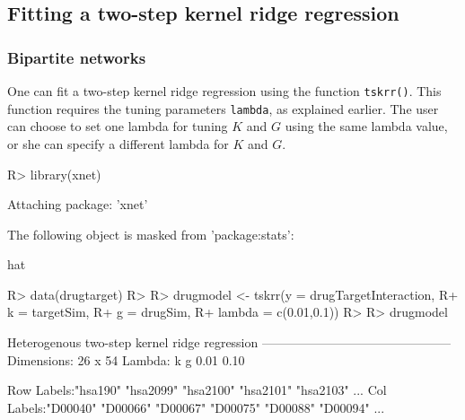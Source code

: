 \documentclass[
]{article}
\begin{document}
\hypertarget{fitting-a-two-step-kernel-ridge-regression}{%
\subsection{Fitting a two-step kernel ridge
regression}\label{fitting-a-two-step-kernel-ridge-regression}}

\hypertarget{bipartite-networks}{%
\subsubsection{Bipartite networks}\label{bipartite-networks}}

One can fit a two-step kernel ridge regression using the function
\texttt{tskrr()}. This function requires the tuning parameters
\texttt{lambda}, as explained earlier. The user can choose to set one
lambda for tuning \(K\) and \(G\) using the same lambda value, or she
can specify a different lambda for \(K\) and \(G\).

\begin{CodeChunk}

\begin{CodeInput}
R> library(xnet)
\end{CodeInput}

\begin{CodeOutput}

Attaching package: 'xnet'
\end{CodeOutput}

\begin{CodeOutput}
The following object is masked from 'package:stats':

    hat
\end{CodeOutput}
\end{CodeChunk}

\begin{CodeChunk}

\begin{CodeInput}
R> data(drugtarget)
R> 
R> drugmodel <- tskrr(y = drugTargetInteraction,
R+                    k = targetSim,
R+                    g = drugSim,
R+                    lambda = c(0.01,0.1))
R> 
R> drugmodel
\end{CodeInput}

\begin{CodeOutput}
Heterogenous two-step kernel ridge regression
---------------------------------------------
Dimensions: 26 x 54 
Lambda:
   k    g 
0.01 0.10 

Row Labels:"hsa190" "hsa2099" "hsa2100" "hsa2101" "hsa2103" ...
Col Labels:"D00040" "D00066" "D00067" "D00075" "D00088" "D00094" ...
\end{CodeOutput}
\end{CodeChunk}
\end{document}
